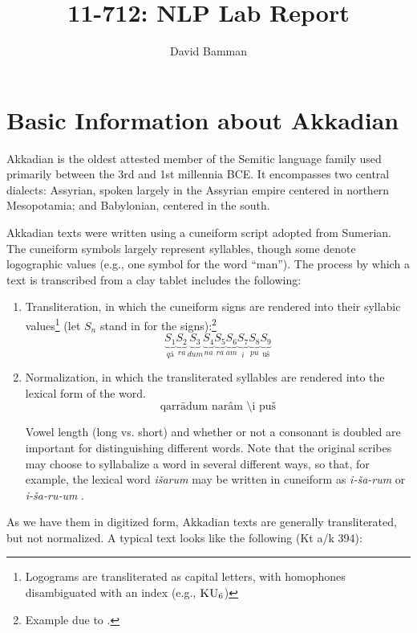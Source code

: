 \documentclass[11pt,letterpaper]{article}
\title{11-712:  NLP Lab Report}
\author{David Bamman}
\begin{document}
\maketitle
\begin{abstract}
\end{abstract}


\section{Basic Information about Akkadian}

Akkadian is the oldest attested member of the Semitic language family used primarily between the 3rd and 1st millennia BCE.  It encompasses two central dialects: Assyrian, spoken largely in the Assyrian empire centered in northern Mesopotamia; and Babylonian, centered in the south.

Akkadian texts were written using a cuneiform script adopted from Sumerian.  The cuneiform symbols largely represent syllables, though some denote logographic values (e.g., one symbol for the word ``man''). 
The process by which a text is transcribed from a clay tablet includes the following:

\begin{enumerate}
\item Transliteration, in which the cuneiform signs are rendered into their syllabic values\footnote{Logograms are transliterated as capital letters, with homophones disambiguated with an index (e.g., $\textrm{\sc{KU}}_6$)}
(let $S_n$ stand in for the signs):\footnote{Example due to \cite[72]{huehnergard}.}
$$
\underbrace{S_1}_{q\textrm{\'a}} \underbrace{S_2}_{ra} \underbrace{S_3}_{dum} \underbrace{S_4}_{na} \underbrace{S_5}_{ra} \underbrace{S_6}_{am} \underbrace{S_7}_{i} \underbrace{S_8}_{pu} \underbrace{S_9}_{\textrm{u\v{s}}}
$$
\item Normalization, in which the transliterated syllables are rendered into the lexical form of the word.  $$
\textrm{qarr\=adum nar\^am \=\i pu\v{s}}
$$

Vowel length (long vs. short) and whether or not a consonant is doubled are important for distinguishing different words. Note that the original scribes may choose to syllabalize a word in several different ways, so that, for example, the lexical word \emph{i\v{s}arum} may be written in cuneiform as \emph{i-\v{s}a-rum} or \emph{i-\v{s}a-ru-um} \cite[71]{huehnergard}.
\end{enumerate}

As we have them in digitized form, Akkadian texts are generally transliterated, but not normalized.  A typical text looks like the following (Kt a/k 394):
\end{document}
